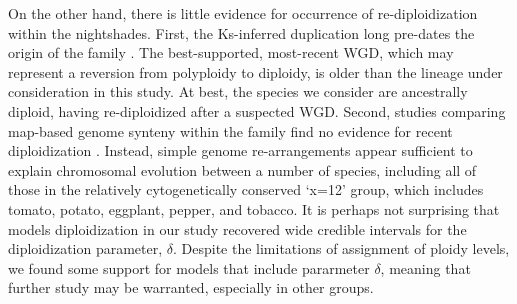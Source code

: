 On the other hand, there is little evidence for occurrence of re-diploidization within the nightshades.
First, the Ks-inferred duplication long pre-dates the origin of the family \citep{sarkinen_2013}. 
The best-supported, most-recent WGD, which may represent a reversion from polyploidy to diploidy, is older than the lineage under consideration in this study.
At best, the species we consider are ancestrally diploid, having re-diploidized after a suspected WGD.
Second, studies comparing map-based genome synteny within the family find no evidence for recent diploidization \citep{wu_2010a}.
Instead, simple genome re-arrangements appear sufficient to explain chromosomal evolution between a number of species, including all of those in the relatively cytogenetically conserved `x=12' group, which includes tomato, potato, eggplant, pepper, and tobacco.
It is perhaps not surprising that models diploidization in our study recovered wide credible intervals for the diploidization parameter, $\delta$. 
Despite the limitations of assignment of ploidy levels, we found some support for models that include pararmeter $\delta$, meaning that further study may be warranted, especially in other groups.

%


